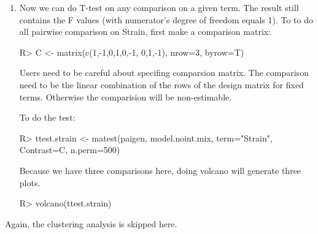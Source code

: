 \begin{enumerate}
\item Now we can do T-test on any comparison on a given term. 
The result still contains the F values (with numerator's degree of freedom
equals 1). To to do all pairwise comparison on Strain, first make
a comparison matrix:
\begin{Sinput}
R> C <- matrix(c(1,-1,0,1,0,-1, 0,1,-1), nrow=3, byrow=T)
\end{Sinput}
Users need to be careful about specifing comparsion matrix. The comparison
need to be the linear combination of the rows of the design matrix
for fixed terms. Otherwise the comparision will be non-estimable.

To do the test:
\begin{Sinput}
R> ttest.strain <- matest(paigen, model.noint.mix, term="Strain",
           Contrast=C, n.perm=500)
\end{Sinput}
Because we have three comparisons here, doing volcano will 
generate three plots.
\begin{Sinput}
R> volcano(ttest.strain)
\end{Sinput}

\end{enumerate}

Again, the clustering analysis is skipped here.


